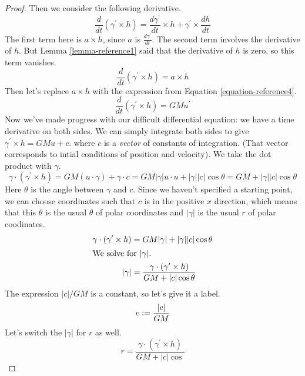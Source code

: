 \documentclass[fleqn,letterpaper]{report}
\begin{document}
\begin{proof}
Then we consider the following derivative.
\begin{equation*}
\frac{d}{dt} (\gamma^\prime \times h) =
\frac{d\gamma^\prime}{dt} \times h + \gamma^\prime \times
\frac{dh}{dt} 
\end{equation*}
The first term here is $a \times h$, since $a$ is
$\frac{d\gamma^\prime}{dt}$. The second term involves the
derivative of $h$. But Lemma \ref{lemma-reference1} said that the
derivative of $h$ is zero, so this term vanishes.
\begin{equation*}
\frac{d}{dt} (\gamma^\prime \times h) = a \times h
\end{equation*}
Then let's replace $a \times h$ with the expression from
Equation \ref{equation-reference4}. 
\begin{equation*}
\frac{d}{dt} (\gamma^\prime \times h) = GM u^\prime
\end{equation*}
Now we've made progress with our difficult differential
equation: we have a time derivative on both sides. We can
simply integrate both sides to give $\gamma^\prime \times h =
GM u + c$. where $c$ is a \emph{vector} of constants of
integration. (That vector corresponds to intial conditions of
position and velocity). We take the dot product with
$\gamma$.
\begin{equation*}
\gamma \cdot (\gamma^\prime \times h) = GM (u \cdot \gamma) +
\gamma \cdot c = GM |\gamma| u \cdot u + |\gamma| |c| \cos
\theta = GM + |\gamma| |c| \cos \theta
\end{equation*}
Here $\theta$ is the angle between $\gamma$ and $c$. Since we
haven't specified a starting point, we can choose coordinates
such that $c$ is in the positive $x$ direction, which means that
this $\theta$ is the usual $\theta$ of polar coordinates and
$|\gamma|$ is the usual $r$ of polar coodinates. 
\begin{align*}
\gamma \cdot (\gamma^\prime \times h) & = GM |\gamma| +
|\gamma| |c| \cos \theta \\
\intertext{We solve for $|\gamma|$.}
|\gamma| & = \frac{\gamma \cdot (\gamma^\prime \times h) } {
GM + |c| \cos \theta}
\end{align*}
The expression $|c|/GM$ is a constant, so let's give it a
label. 
\begin{equation}
\label{equation-reference8}
e \mathrel{\mathop:}= \frac{|c|}{GM}
\end{equation}
Let's switch the $|\gamma|$ for $r$ as well. 
\begin{equation*}
r = \frac{\gamma \cdot (\gamma^\prime \times h) } { GM + |c| \cos
}
\end{equation*}
\end{proof}
\end{document}
